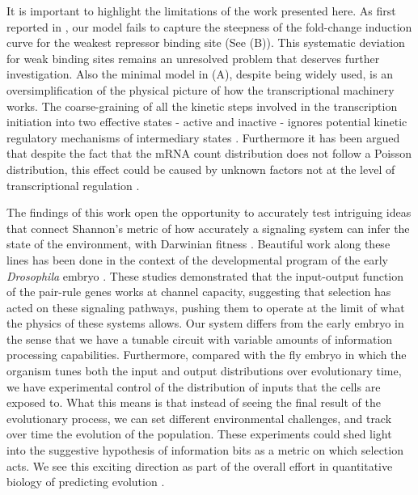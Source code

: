 It is important to highlight the limitations of the work presented here. As
first reported in \cite{Razo-Mejia2018}, our model fails to capture the
steepness of the fold-change induction curve for the weakest repressor binding
site (See (B)). This systematic deviation for weak binding
sites remains an unresolved problem that deserves further investigation. Also
the minimal model in (A), despite being widely used,
is an oversimplification of the physical picture of how the transcriptional
machinery works. The coarse-graining of all the kinetic steps involved in the
transcription initiation into two effective states - active and inactive -
ignores potential kinetic regulatory mechanisms of intermediary states
\cite{Scholes2017}. Furthermore it has been argued that despite the fact that
the mRNA count distribution does not follow a Poisson distribution, this effect
could be caused by unknown factors not at the level of transcriptional
regulation \cite{Choubey2018}.

The findings of this work open the opportunity to accurately test intriguing
ideas that connect Shannon's metric of how accurately a signaling system can
infer the state of the environment, with Darwinian fitness \cite{Taylor2007}.
Beautiful work along these lines has been done in the context of the
developmental program of the early {\it Drosophila} embryo \cite{Tkacik2008,
Petkova2019}. These studies demonstrated that the input-output function of the
pair-rule genes works at channel capacity, suggesting that selection has
acted on these signaling pathways, pushing them to operate at the limit of what
the physics of these systems allows. Our system differs from the early embryo in
the sense that we have a tunable circuit with variable amounts of information
processing capabilities. Furthermore, compared with the fly embryo in which the
organism tunes both the input and output distributions over evolutionary time,
we have experimental control of the distribution of inputs that the cells are
exposed to. What this means is that instead of seeing the final result of the
evolutionary process, we can set different environmental challenges, and track
over time the evolution of the population. These experiments could shed light
into the suggestive hypothesis of information bits as a metric on which
selection acts. We see this exciting direction as part of the overall effort in
quantitative biology of predicting evolution \cite{Lassig2017}.
